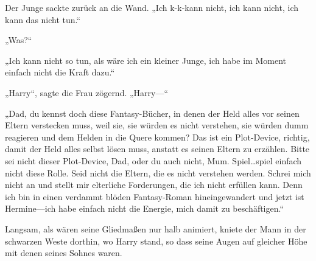 Der Junge sackte zurück an die Wand.
„Ich k-k-kann nicht, ich kann nicht, ich kann das nicht tun.“

„Was?“

„Ich kann nicht so tun, als wäre ich ein kleiner Junge, ich habe im Moment einfach nicht die Kraft dazu.“

„Harry“, sagte die Frau zögernd. „Harry—“

„Dad, du kennst doch diese Fantasy-Bücher, in denen der Held alles vor seinen Eltern verstecken muss, weil sie, sie würden es nicht verstehen, sie würden dumm reagieren und dem Helden in die Quere kommen? Das ist ein Plot-Device, richtig, damit der Held alles selbst lösen muss, anstatt es seinen Eltern zu erzählen. Bitte sei nicht dieser Plot-Device, Dad, oder du auch nicht, Mum. Spiel…spiel einfach nicht diese Rolle. Seid nicht die Eltern, die es nicht verstehen werden. Schrei mich nicht an und stellt mir elterliche Forderungen, die ich nicht erfüllen kann. Denn ich bin in einen verdammt blöden Fantasy-Roman hineingewandert und jetzt ist Hermine—ich habe einfach nicht die Energie, mich damit zu beschäftigen.“

Langsam, als wären seine Gliedmaßen nur halb animiert, kniete der Mann in der schwarzen Weste dorthin, wo Harry stand, so dass seine Augen auf gleicher Höhe mit denen seines Sohnes waren.

